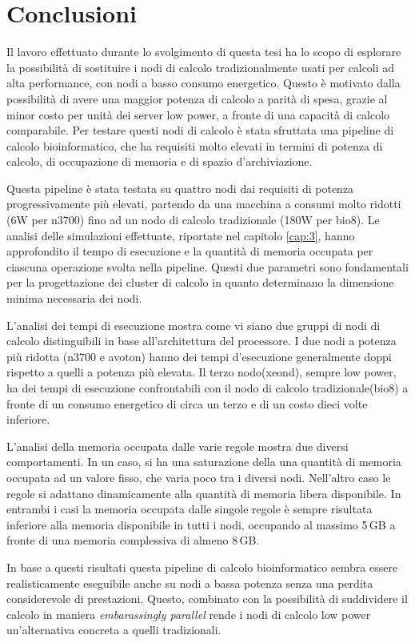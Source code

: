\chapter{Conclusioni}
Il lavoro effettuato durante lo svolgimento di questa tesi ha lo scopo di esplorare la possibilità di sostituire i nodi di calcolo tradizionalmente usati per calcoli ad alta performance, con nodi a basso consumo energetico.
Questo è motivato dalla possibilità di avere una maggior potenza di calcolo a parità di spesa, grazie al minor costo per unità dei server low power, a fronte di una capacità di calcolo comparabile.
Per testare questi nodi di calcolo è stata sfruttata una pipeline di calcolo bioinformatico, che ha requisiti molto elevati in termini di potenza di calcolo, di occupazione di memoria e di spazio d'archiviazione.

Questa pipeline è stata testata su quattro nodi dai requisiti di potenza progressivamente più elevati, partendo da una macchina a consumi molto ridotti (6W per n3700) fino ad un nodo di calcolo tradizionale (180W per bio8).
Le analisi delle simulazioni effettuate, riportate nel capitolo \ref{cap:3}, hanno approfondito il tempo di esecuzione e la quantità di memoria occupata per ciascuna operazione svolta nella pipeline.
Questi due parametri sono fondamentali per la progettazione dei cluster di calcolo in quanto determinano la dimensione minima necessaria dei nodi.

L'analisi dei tempi di esecuzione mostra come vi siano due gruppi di nodi di calcolo distinguibili in base all'architettura del processore.
I due nodi a potenza più ridotta (n3700 e avoton) hanno dei tempi d'esecuzione generalmente doppi rispetto a quelli a potenza più elevata.
Il terzo nodo(xeond), sempre low power, ha dei tempi di esecuzione confrontabili con il nodo di calcolo tradizionale(bio8) a fronte di un consumo energetico di circa un terzo e di un costo dieci volte inferiore.

L'analisi della memoria occupata dalle varie regole mostra due diversi comportamenti.
In un caso, si ha una saturazione della una quantità di memoria occupata ad un valore fisso, che varia poco tra i diversi nodi.
Nell'altro caso le regole si adattano dinamicamente alla quantità di memoria libera disponibile.
In entrambi i casi la memoria occupata dalle singole regole è sempre risultata inferiore alla memoria disponibile in tutti i nodi, occupando al massimo 5\,GB a fronte di una memoria complessiva di almeno 8\,GB.

In base a questi risultati questa pipeline di calcolo bioinformatico sembra essere realisticamente eseguibile anche su nodi a bassa potenza senza una perdita considerevole di prestazioni.
Questo, combinato con la possibilità di suddividere il calcolo in maniera \textit{embarassingly parallel} rende i nodi di calcolo low power un'alternativa concreta a quelli tradizionali. 

